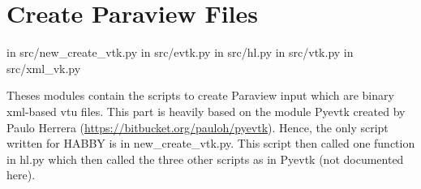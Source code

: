 \documentclass[letterpaper,10pt,english]{sphinxmanual}
\begin{document}
\section{Create Paraview Files}
\label{\detokenize{index:create-paraview-files}}
in src/new\_create\_vtk.py
in src/evtk.py
in src/hl.py
in src/vtk.py
in src/xml\_vk.py

Theses modules contain the scripts to create Paraview input which are binary xml-based vtu files. This part is heavily based on the module
Pyevtk created by Paulo Herrera (\url{https://bitbucket.org/pauloh/pyevtk}). Hence, the only script written for HABBY is in new\_create\_vtk.py. This
script then called one function in hl.py which then called the three other scripts as in Pyevtk (not documented here).
\label{\detokenize{index:module-src.new_create_vtk}}
\end{document}
